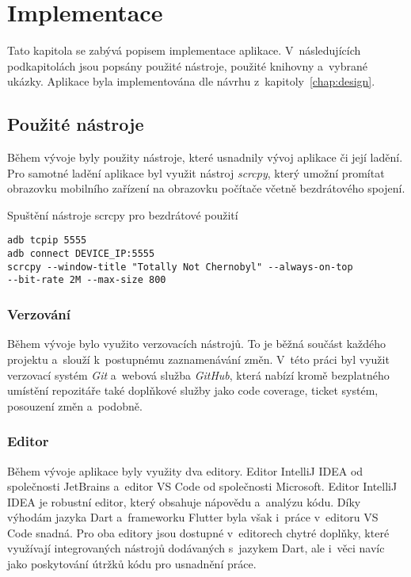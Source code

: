 \chapter{Implementace}
\label{chap:implementation}

Tato kapitola se zabývá popisem implementace aplikace.
V~následujících podkapitolách jsou popsány použité nástroje,
použité knihovny a~vybrané ukázky.
Aplikace byla implementována dle návrhu z~kapitoly~\ref{chap:design}.

\section{Použité nástroje}

Během vývoje byly použity nástroje,
které usnadnily vývoj aplikace či její ladění.
Pro samotné ladění aplikace byl využit nástroj \emph{scrcpy},
který umožní promítat obrazovku mobilního zařízení na obrazovku počítače
včetně bezdrátového spojení.

\begin{listing}
    \caption{Spuštění nástroje scrcpy pro bezdrátové použití}
    \label{code:scrcpy}
    \begin{verbatim}
adb tcpip 5555
adb connect DEVICE_IP:5555
scrcpy --window-title "Totally Not Chernobyl" --always-on-top
--bit-rate 2M --max-size 800
    \end{verbatim}
\end{listing}

\subsection{Verzování}

Během vývoje bylo využito verzovacích nástrojů.
To je běžná součást každého projektu a~slouží k~postupnému zaznamenávání změn.
V~této práci byl využit verzovací systém \emph{Git} a~webová služba \emph{GitHub},
která nabízí kromě bezplatného umístění repozitáře také doplňkové služby jako
code coverage, ticket systém, posouzení změn a~podobně.

\subsection{Editor}

Během vývoje aplikace byly využity dva editory.
Editor IntelliJ IDEA od společnosti JetBrains
a~editor VS Code od společnosti Microsoft.
Editor IntelliJ IDEA je robustní editor,
který obsahuje nápovědu a~analýzu kódu.
Díky výhodám jazyka Dart a~frameworku Flutter
byla však i~práce v~editoru VS Code snadná.
Pro oba editory jsou dostupné v~editorech chytré doplňky,
které využívají integrovaných nástrojů dodávaných s~jazykem Dart,
ale i~věci navíc jako poskytování útržků kódu pro usnadnění práce.

